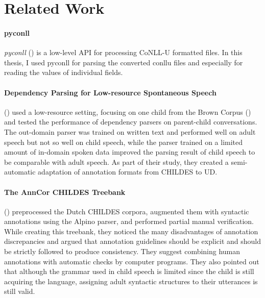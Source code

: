 \section{Related Work}

\paragraph{pyconll} %
\label{par:pyconll}
\emph{pyconll} (\cite{pyconll}) is a low-level API for processing CoNLL-U formatted files. In this thesis, I used pyconll for parsing the converted conllu files and especially for reading the values of individual fields.


\paragraph{Dependency Parsing for Low-resource Spontaneous Speech} %
\label{par:zoey}
(\cite{liu2021}) used a low-resource setting, focusing on one child from the Brown Corpus (\cite{brown1973}) and tested the performance of dependency parsers on parent-child conversations. The out-domain parser was trained on written text and performed well on adult speech but not so well on child speech, while the parser trained on a limited amount of in-domain spoken data improved the parsing result of child speech to be comparable with adult speech. As part of their study, they created a semi-automatic adaptation of annotation formats from CHILDES to UD.

\paragraph{The AnnCor CHILDES Treebank}
(\cite{odijk2018anncor}) preprocessed the Dutch CHILDES corpora, augmented them with syntactic annotations using the Alpino parser, and performed partial manual verification. While creating this treebank, they noticed the many disadvantages of annotation discrepancies and argued that annotation guidelines should be explicit and should be strictly followed to produce consistency. They suggest combining human annotations with automatic checks by computer programs. They also pointed out that although the grammar used in child speech is limited since the child is still acquiring the language, assigning adult syntactic structures to their utterances is still valid.
